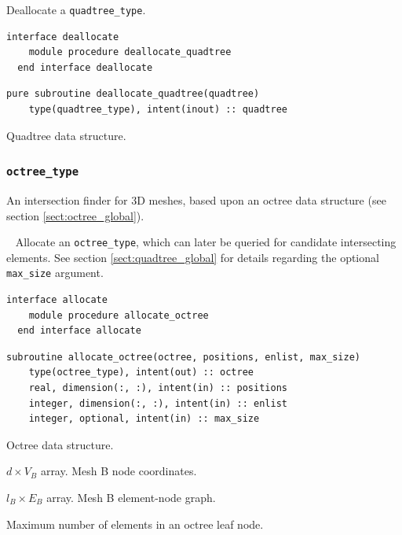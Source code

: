 \documentclass{article}
\begin{document}
\noindent Deallocate a \verb+quadtree_type+.
  
\begin{lstlisting}[language=FORTRAN]
  interface deallocate
    module procedure deallocate_quadtree
  end interface deallocate
\end{lstlisting}
  
\begin{lstlisting}[language=FORTRAN]
  pure subroutine deallocate_quadtree(quadtree)
    type(quadtree_type), intent(inout) :: quadtree
\end{lstlisting}

\begin{description}[font=\ttfamily\bfseries,leftmargin=2.2\parindent,labelindent=1.7\parindent,noitemsep]
  \item[quadtree] Quadtree data structure.
\end{description}

\subsubsection{\texttt{octree\_type}}\label{sect:octree_query}
  
An intersection finder for 3D meshes, based upon an octree data structure (see
section \ref{sect:octree_global}).

~\newline
Allocate an \verb+octree_type+, which can later be queried for candidate
intersecting elements. See section \ref{sect:quadtree_global} for details
regarding the optional \verb+max_size+ argument.

\begin{lstlisting}[language=FORTRAN]
  interface allocate
    module procedure allocate_octree
  end interface allocate
\end{lstlisting}
  
\begin{lstlisting}[language=FORTRAN]
  subroutine allocate_octree(octree, positions, enlist, max_size)
    type(octree_type), intent(out) :: octree
    real, dimension(:, :), intent(in) :: positions
    integer, dimension(:, :), intent(in) :: enlist
    integer, optional, intent(in) :: max_size 
\end{lstlisting}

\begin{description}[font=\ttfamily\bfseries,leftmargin=2.2\parindent,labelindent=1.7\parindent,noitemsep]
  \item[octree] Octree data structure.
  \item[positions] $d \times V_B$ array. Mesh B node coordinates.
  \item[enlist] $l_B \times E_B$ array. Mesh B element-node graph.
  \item[max\_size] Maximum number of elements in an octree leaf node.
\end{description}
\end{document}
